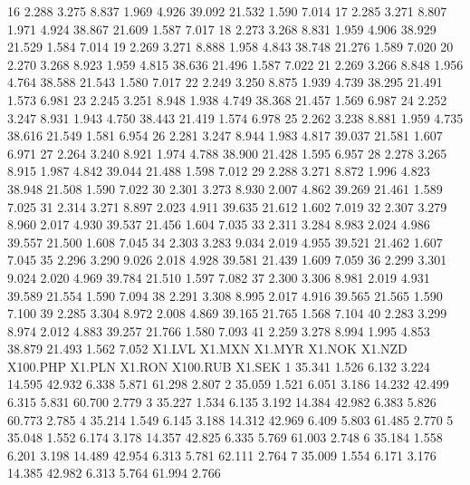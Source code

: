 \documentclass[a4paper,11pt]{scrartcl}
\begin{document}
\begin{Schunk}
\begin{Soutput}
16  2.288  3.275    8.837     1.969  4.926   39.092   21.532    1.590  7.014
17  2.285  3.271    8.807     1.971  4.924   38.867   21.609    1.587  7.017
18  2.273  3.268    8.831     1.959  4.906   38.929   21.529    1.584  7.014
19  2.269  3.271    8.888     1.958  4.843   38.748   21.276    1.589  7.020
20  2.270  3.268    8.923     1.959  4.815   38.636   21.496    1.587  7.022
21  2.269  3.266    8.848     1.956  4.764   38.588   21.543    1.580  7.017
22  2.249  3.250    8.875     1.939  4.739   38.295   21.491    1.573  6.981
23  2.245  3.251    8.948     1.938  4.749   38.368   21.457    1.569  6.987
24  2.252  3.247    8.931     1.943  4.750   38.443   21.419    1.574  6.978
25  2.262  3.238    8.881     1.959  4.735   38.616   21.549    1.581  6.954
26  2.281  3.247    8.944     1.983  4.817   39.037   21.581    1.607  6.971
27  2.264  3.240    8.921     1.974  4.788   38.900   21.428    1.595  6.957
28  2.278  3.265    8.915     1.987  4.842   39.044   21.488    1.598  7.012
29  2.288  3.271    8.872     1.996  4.823   38.948   21.508    1.590  7.022
30  2.301  3.273    8.930     2.007  4.862   39.269   21.461    1.589  7.025
31  2.314  3.271    8.897     2.023  4.911   39.635   21.612    1.602  7.019
32  2.307  3.279    8.960     2.017  4.930   39.537   21.456    1.604  7.035
33  2.311  3.284    8.983     2.024  4.986   39.557   21.500    1.608  7.045
34  2.303  3.283    9.034     2.019  4.955   39.521   21.462    1.607  7.045
35  2.296  3.290    9.026     2.018  4.928   39.581   21.439    1.609  7.059
36  2.299  3.301    9.024     2.020  4.969   39.784   21.510    1.597  7.082
37  2.300  3.306    8.981     2.019  4.931   39.589   21.554    1.590  7.094
38  2.291  3.308    8.995     2.017  4.916   39.565   21.565    1.590  7.100
39  2.285  3.304    8.972     2.008  4.869   39.165   21.765    1.568  7.104
40  2.283  3.299    8.974     2.012  4.883   39.257   21.766    1.580  7.093
41  2.259  3.278    8.994     1.995  4.853   38.879   21.493    1.562  7.052
   X1.LVL X1.MXN X1.MYR X1.NOK X1.NZD X100.PHP X1.PLN X1.RON X100.RUB X1.SEK
1  35.341  1.526  6.132  3.224 14.595   42.932  6.338  5.871   61.298  2.807
2  35.059  1.521  6.051  3.186 14.232   42.499  6.315  5.831   60.700  2.779
3  35.227  1.534  6.135  3.192 14.384   42.982  6.383  5.826   60.773  2.785
4  35.214  1.549  6.145  3.188 14.312   42.969  6.409  5.803   61.485  2.770
5  35.048  1.552  6.174  3.178 14.357   42.825  6.335  5.769   61.003  2.748
6  35.184  1.558  6.201  3.198 14.489   42.954  6.313  5.781   62.111  2.764
7  35.009  1.554  6.171  3.176 14.385   42.982  6.313  5.764   61.994  2.766

\end{Soutput}
\end{Schunk}
\end{document}

